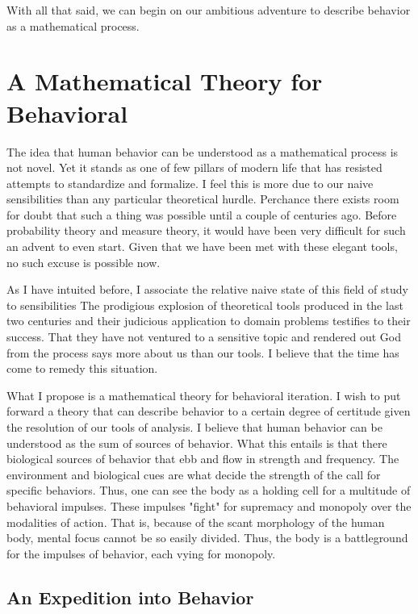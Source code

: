\documentclass[12pt]{article}
\begin{document}
With all that said, we can begin on our ambitious adventure to describe behavior as a mathematical process.

\section{A Mathematical Theory for Behavioral}
The idea that human behavior can be understood as a mathematical process is not novel.
Yet it stands as one of few pillars of modern life that has resisted attempts to standardize and formalize.
I feel this is more due to our naive sensibilities than any particular theoretical hurdle.
Perchance there exists room for doubt that such a thing was possible until a couple of centuries ago.
Before probability theory and measure theory, it would have been very difficult for such an advent to even start.
Given that we have been met with these elegant tools, no such excuse is possible now.

As I have intuited before, I associate the relative naive state of this field of study to sensibilities
The prodigious explosion of theoretical tools produced in the last two centuries and their judicious application to domain problems testifies to their success.
That they have not ventured to a sensitive topic and rendered out God from the process says more about us than our tools.
I believe that the time has come to remedy this situation.

What I propose is a mathematical theory for behavioral iteration.
I wish to put forward a theory that can describe behavior to a certain degree of certitude given the resolution of our tools of analysis.
I believe that human behavior can be understood as the sum of sources of behavior.
What this entails is that there biological sources of behavior that ebb and flow in strength and frequency.
The environment and biological cues are what decide the strength of the call for specific behaviors.
Thus, one can see the body as a holding cell for a multitude of behavioral impulses.
These impulses "fight" for supremacy and monopoly over the modalities of action.
That is, because of the scant morphology of the human body, mental focus cannot be so easily divided.
Thus, the body is a battleground for the impulses of behavior, each vying for monopoly.

\subsection{An Expedition into Behavior}
\end{document}
